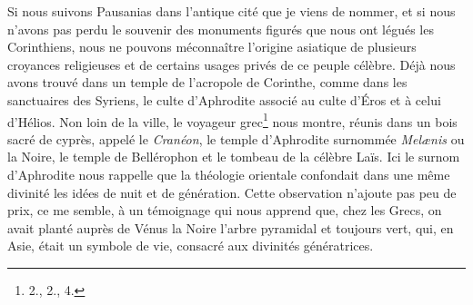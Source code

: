 \documentclass{article}
\begin{document}
Si nous suivons Pausanias dans l'antique cité que je viens de nommer, et si nous n'avons pas perdu le souvenir des monuments figurés que nous ont légués les Corinthiens, nous ne pouvons méconnaître l'origine asiatique de plusieurs croyances religieuses et de certains usages privés de ce peuple célèbre. Déjà nous avons trouvé dans un temple de l'acropole de Corinthe, comme dans les sanctuaires des Syriens, le culte d'Aphrodite associé au culte d'Éros et à celui d'Hélios. Non loin de la ville, le voyageur grec\footnote{2., 2., 4.} nous montre, réunis dans un bois sacré de cyprès, appelé le \emph{Cranéon}, le temple d'Aphrodite surnommée \emph{Melænis} ou la Noire, le temple de Bellérophon et le tombeau de la célèbre Laïs. Ici le surnom d'Aphrodite nous rappelle que la théologie orientale confondait dans une même divinité les idées de nuit et de génération. Cette observation n'ajoute pas peu de prix, ce me semble, à un témoignage qui nous apprend que, chez les Grecs, on avait planté auprès de Vénus la Noire l'arbre pyramidal et toujours vert, qui, en Asie, était un symbole de vie, consacré aux divinités génératrices.
\end{document}
